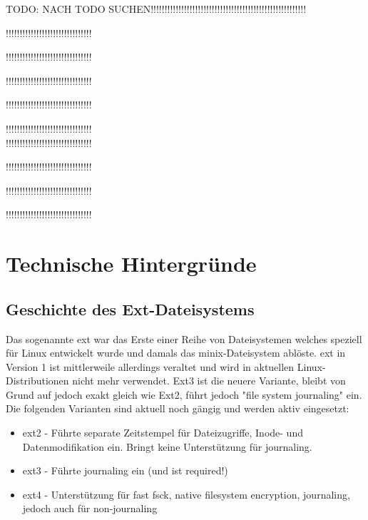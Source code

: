 

TODO: NACH TODO SUCHEN!!!!!!!!!!!!!!!!!!!!!!!!!!!!!!!!!!!!!!!!!!!!!!!!!!!!!!!!

!!!!!!!!!!!!!!!!!!!!!!!!!!!!!!!

!!!!!!!!!!!!!!!!!!!!!!!!!!!!!!!

!!!!!!!!!!!!!!!!!!!!!!!!!!!!!!!

!!!!!!!!!!!!!!!!!!!!!!!!!!!!!!!

!!!!!!!!!!!!!!!!!!!!!!!!!!!!!!!\\

!!!!!!!!!!!!!!!!!!!!!!!!!!!!!!!

!!!!!!!!!!!!!!!!!!!!!!!!!!!!!!!

!!!!!!!!!!!!!!!!!!!!!!!!!!!!!!!

!!!!!!!!!!!!!!!!!!!!!!!!!!!!!!!






\section{Technische Hintergründe}

\subsection{Geschichte des Ext-Dateisystems}


Das sogenannte \ac{ext} war das Erste einer Reihe von Dateisystemen welches speziell für Linux entwickelt wurde und damals das minix-Dateisystem ablöste. \ac{ext} in Version 1 ist mittlerweile allerdings veraltet und wird in aktuellen Linux-Distributionen nicht mehr verwendet. Ext3 ist die neuere Variante, bleibt von Grund auf jedoch exakt gleich wie Ext2, führt jedoch "file system journaling" ein. Die folgenden Varianten sind aktuell noch gängig und werden aktiv eingesetzt:

\begin{itemize}
	\item ext2 - Führte separate Zeitstempel für Dateizugriffe, Inode- und Datenmodifikation ein. Bringt keine Unterstützung für journaling.
	\item ext3 - Führte journaling ein (und ist required!)
	\item ext4 - Unterstützung für fast fsck, native filesystem encryption, journaling, jedoch auch für non-journaling
\end{itemize}


